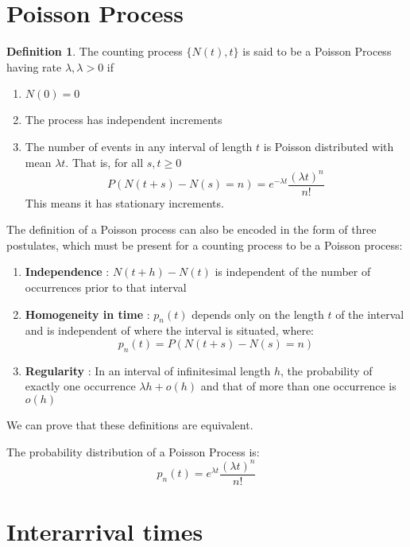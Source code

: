 \documentclass[12pt,letterpaper]{book}
\theoremstyle{definition}
\newtheorem{definition}{Definition}%
\begin{document}
\section{Poisson Process}

\begin{definition}
  The counting process $\{N(t),t\}$ is said to be a Poisson Process having rate $\lambda, \lambda > 0$ if 
  \begin{enumerate}
    \item $N(0) = 0$
    \item The process has independent increments
    \item The number of events in any interval of length $t$ is Poisson distributed with mean $\lambda t$. That is, for all $s,t \geq 0$
      \[P(N(t+s) - N(s) = n) = e^{- \lambda t}\frac{(\lambda t) ^ n}{n!}\]
      This means it has stationary increments.
  \end{enumerate}
\end{definition}

The definition of a Poisson process can also be encoded in the form of three postulates, which must be present for a counting process to be a Poisson process:

\begin{enumerate}
  \item \textbf{Independence} : $N(t+h) - N(t)$ is independent of the number of occurrences prior to that interval
  \item \textbf{Homogeneity in time} : $p_n(t)$ depends only on the length $t$ of the interval and is independent of where the interval is situated, where:
    \[p_n(t) = P(N(t+s) - N(s) = n)\]
  \item \textbf{Regularity} : In an interval of infinitesimal length $h$, the probability of exactly one occurrence $\lambda h + o(h)$ and that of more than one occurrence is $o(h)$
\end{enumerate}

We can prove that these definitions are equivalent.

\begin{theorem}
  The probability distribution of a Poisson Process is:
  \[p_n(t) = e^{\lambda t} \frac{(\lambda t)^n}{n!}\]
\end{theorem}

\section{Interarrival times}
\end{document}
